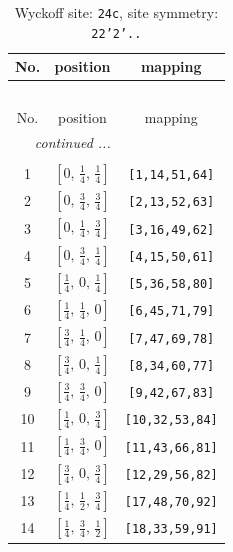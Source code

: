\documentclass[fleqn,8pt]{jsarticle}
\begin{document}
\begin{longtable}{ccc}
\caption{Wyckoff site: {\tt 24c}, site symmetry: {\tt 22'2'..}}
 \\
 \hline \hline
No. & position & mapping \\ \hline \endfirsthead

\multicolumn{2}{l}{\tablename\ \thetable{}} \\
 \hline \hline
No. & position & mapping \\ \hline \endhead

 \hline \hline
\multicolumn{2}{r}{\footnotesize\it continued ...} \\ \endfoot

 \hline \hline
\multicolumn{2}{r}{} \\ \endlastfoot

1 & $\left[ 0,\, \frac{1}{4},\, \frac{1}{4} \right]$ & {\tt [1,14,51,64]} \\ \hline
2 & $\left[ 0,\, \frac{3}{4},\, \frac{3}{4} \right]$ & {\tt [2,13,52,63]} \\ \hline
3 & $\left[ 0,\, \frac{1}{4},\, \frac{3}{4} \right]$ & {\tt [3,16,49,62]} \\ \hline
4 & $\left[ 0,\, \frac{3}{4},\, \frac{1}{4} \right]$ & {\tt [4,15,50,61]} \\ \hline
5 & $\left[ \frac{1}{4},\, 0,\, \frac{1}{4} \right]$ & {\tt [5,36,58,80]} \\ \hline
6 & $\left[ \frac{1}{4},\, \frac{1}{4},\, 0 \right]$ & {\tt [6,45,71,79]} \\ \hline
7 & $\left[ \frac{3}{4},\, \frac{1}{4},\, 0 \right]$ & {\tt [7,47,69,78]} \\ \hline
8 & $\left[ \frac{3}{4},\, 0,\, \frac{1}{4} \right]$ & {\tt [8,34,60,77]} \\ \hline
9 & $\left[ \frac{3}{4},\, \frac{3}{4},\, 0 \right]$ & {\tt [9,42,67,83]} \\ \hline
10 & $\left[ \frac{1}{4},\, 0,\, \frac{3}{4} \right]$ & {\tt [10,32,53,84]} \\ \hline
11 & $\left[ \frac{1}{4},\, \frac{3}{4},\, 0 \right]$ & {\tt [11,43,66,81]} \\ \hline
12 & $\left[ \frac{3}{4},\, 0,\, \frac{3}{4} \right]$ & {\tt [12,29,56,82]} \\ \hline
13 & $\left[ \frac{1}{4},\, \frac{1}{2},\, \frac{3}{4} \right]$ & {\tt [17,48,70,92]} \\ \hline
14 & $\left[ \frac{1}{4},\, \frac{3}{4},\, \frac{1}{2} \right]$ & {\tt [18,33,59,91]} \\ \hline

\end{longtable}
\end{document}
